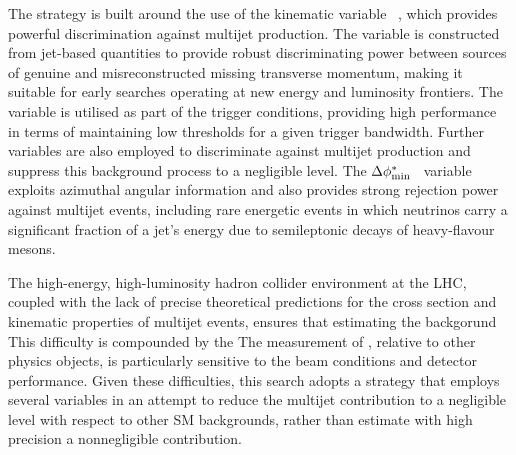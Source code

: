 The strategy is built around the use of the kinematic variable
\alphat~\cite{Randall:2008rw, RA1Paper}, which provides powerful
discrimination against multijet production. The \alphat variable is
constructed from jet-based quantities to provide robust discriminating
power between sources of genuine and misreconstructed missing
transverse momentum, making it suitable for early searches operating
at new energy and luminosity frontiers. The \alphat variable is
utilised as part of the trigger conditions, providing high performance
in terms of maintaining low thresholds for a given trigger
bandwidth. Further variables are also employed to discriminate against
multijet production and suppress this background process to a
negligible level. The $\Delta\phi^{*}_{\rm min}$~\cite{RA1Paper}
variable exploits azimuthal angular information and also provides
strong rejection power against multijet events, including rare
energetic events in which neutrinos carry a significant fraction of a
jet's energy due to semileptonic decays of heavy-flavour mesons.


The high-energy, high-luminosity hadron collider environment at the
LHC, coupled with the lack of precise theoretical predictions for the
cross section and kinematic properties of multijet events, ensures
that estimating the backgorund
This difficulty is compounded by the 
The measurement of \ptvecmiss, relative to other physics objects, is
particularly sensitive to the beam conditions and detector
performance. 
Given these difficulties, this search adopts a strategy that employs
several variables in an attempt to reduce the multijet contribution to
a negligible level with respect to other SM backgrounds, rather than
estimate with high precision a nonnegligible contribution. 



